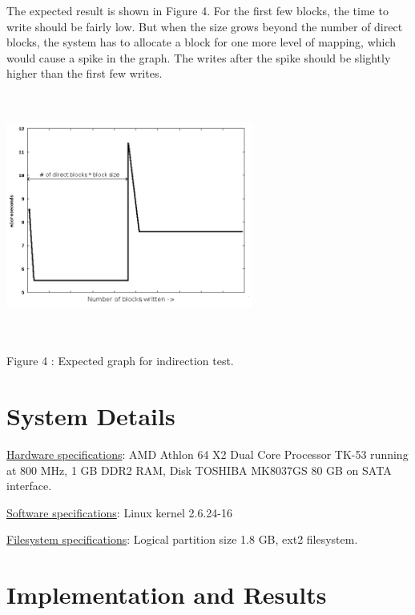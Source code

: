 \documentclass[twocolumn,11pt]{article}
\begin{document}
\begin{sloppypar}
The expected result is shown in Figure 4. For the first few blocks, the
time to write should be fairly low. But when the size grows beyond the
number of direct blocks, the system has to allocate a block for one
more level of mapping, which would cause a spike in the graph. The writes
after the spike should be slightly higher than the first few writes.

\includegraphics[width=230pt,height=230pt]{indirection_ideal.png}
\begin{center}
Figure 4 : Expected graph for indirection test.
\end{center}



\section{System Details}
\label{sec:System Details}
\underline{Hardware specifications}: AMD Athlon 64 X2 Dual Core Processor
TK-53 running at 800 MHz, 1 GB DDR2 RAM, Disk TOSHIBA MK8037GS 80 GB
on SATA interface.

\underline{Software specifications}: Linux kernel 2.6.24-16

\underline{Filesystem specifications}: Logical partition size 1.8 GB,
ext2 filesystem.


\section{Implementation and Results}
\label{sec:Implementation and Results}


\end{sloppypar}
\end{document}
